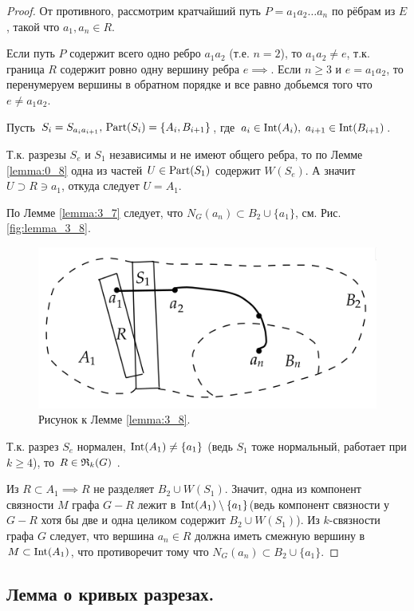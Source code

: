 \begin{proof}
	От противного, рассмотрим кратчайший путь $P = a_1 a_2 \ldots a_n$ по рёбрам из $E$, такой что  $a_1, a_n \in R$.

	Если путь $P$ содержит всего одно ребро  $a_1a_2$ (т.е. $n = 2$), то $a_1a_2 \neq e$, т.к. граница $R$ содержит ровно одну вершину ребра $e \implies$. Если $n \geqslant 3$ и  $e = a_1a_2$, то перенумеруем вершины в обратном порядке и все равно добьемся того что $e \neq a_1a_2$.

	Пусть $S_i = S_{a_i a_{i + 1}}, \, \operatorname{Part}(S_i) = \{A_i, B_{i + 1}\}$, где  $a_i \in \operatorname{Int}(A_i), \; a_{i + 1} \in \operatorname{Int}(B_{i + 1})$.

	Т.к. разрезы  $S_e$ и  $S_1$ независимы и не имеют общего ребра, то по Лемме \ref{lemma:0_8} одна из частей $U \in \operatorname{Part}(S_1)$ содержит  $W(S_e)$.
	А значит  $U \supset R \ni a_1$, откуда следует  $U = A_1$.

	По Лемме \ref{lemma:3_7} следует, что  $N_G(a_n) \subset B_2 \cup \{a_1\}$, см. Рис. \eqref{fig:lemma_3_8}.
\begin{figure}[ht]
    \centering
	\includegraphics[width=0.4\columnwidth]{figures/lemma_3_8.png}
	\caption{Рисунок к Лемме \ref{lemma:3_8}.}
    \label{fig:lemma_3_8}
\end{figure}

Т.к. разрез $S_e$ нормален, $\operatorname{Int}(A_1) \neq \{a_1\}$  (ведь $S_1$ тоже нормальный, работает при $k \geqslant 4$), то $R \in \mathfrak{R}_k(G)$ .

Из $R \subset A_1 \implies R$ не разделяет  $B_2 \cup W(S_1)$.
Значит, одна из компонент связности $M$ графа $G - R$ лежит в $\operatorname{Int}(A_1) \setminus \{a_1\}$(ведь компонент связности у $G - R$ хотя бы две и одна целиком содержит  $B_2 \cup W(S_1)$).
Из $k$-связности графа  $G$ следует, что вершина $a_n \in R$ должна иметь смежную вершину в  $M \subset \operatorname{Int}(A_1)$, что противоречит тому что $N_G(a_n) \subset B_2 \cup \{a_1\}$.
\end{proof}

\subsection{Лемма о кривых разрезах.}

